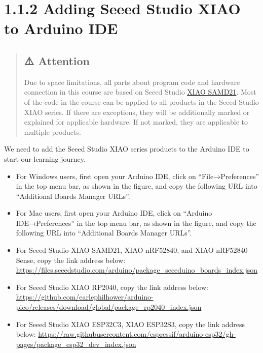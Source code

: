 \documentclass[
  letterpaper,
  DIV=11,
  numbers=noendperiod]{scrreprt}
\providecommand{\tightlist}{%
  \setlength{\itemsep}{0pt}\setlength{\parskip}{0pt}}\usepackage{longtable,booktabs,array}
\begin{document}
\hypertarget{adding-seeed-studio-xiao-to-arduino-ide}{%
\section*{1.1.2 Adding Seeed Studio XIAO to Arduino
IDE}\label{adding-seeed-studio-xiao-to-arduino-ide}}


\begin{quote}
\hypertarget{attention}{%
\subsection*{⚠️ Attention}\label{attention}}

Due to space limitations, all parts about program code and hardware
connection in this course are based on Seeed Studio
\href{https://www.seeedstudio.com/Seeeduino-XIAO-Arduino-Microcontroller-SAMD21-Cortex-M0+-p-4426.html}{XIAO
SAMD21}. Most of the code in the course can be applied to all products
in the Seeed Studio XIAO series. If there are exceptions, they will be
additionally marked or explained for applicable hardware. If not marked,
they are applicable to multiple products.
\end{quote}

We need to add the Seeed Studio XIAO series products to the Arduino IDE
to start our learning journey.

\begin{itemize}
\tightlist
\item
  For Windows users, first open your Arduino IDE, click on
  ``File→Preferences'' in the top menu bar, as shown in the figure, and
  copy the following URL into ``Additional Boards Manager URLs''.
\item
  For Mac users, first open your Arduino IDE, click on ``Arduino
  IDE→Preferences'' in the top menu bar, as shown in the figure, and
  copy the following URL into ``Additional Boards Manager URLs''.
\item
  For Seeed Studio XIAO SAMD21, XIAO nRF52840, and XIAO nRF52840 Sense,
  copy the link address below:
  \url{https://files.seeedstudio.com/arduino/package_seeeduino_boards_index.json}
\item
  For Seeed Studio XIAO RP2040, copy the link address below:
  \url{https://github.com/earlephilhower/arduino-pico/releases/download/global/package_rp2040_index.json}
\item
  For Seeed Studio XIAO ESP32C3, XIAO ESP32S3, copy the link address
  below:
  \url{https://raw.githubusercontent.com/espressif/arduino-esp32/gh-pages/package_esp32_dev_index.json}
\end{itemize}
\end{document}
